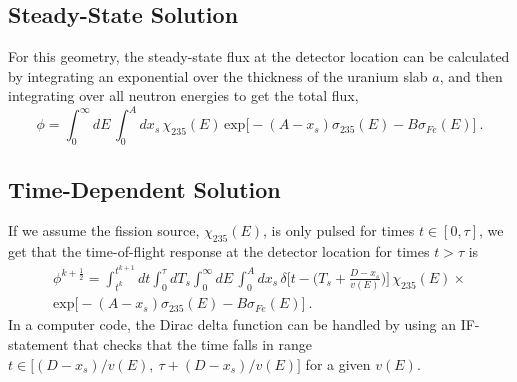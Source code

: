 \documentclass{article}
\begin{document}
\subsection{Steady-State Solution}
For this geometry, the steady-state flux at the detector location can be calculated by integrating an exponential over the thickness of the uranium slab $a$, and then integrating over all neutron energies to get the total flux,
\begin{equation}
\phi = \int_0^\infty dE \, \int_0^A dx_s \, \chi_{235}(E) \, \text{exp}\big[-(A - x_s) \sigma_{235}(E) - B \sigma_{Fe}(E)\big] \: .
\end{equation}

\subsection{Time-Dependent Solution}
If we assume the fission source, $\chi_{235}(E)$, is only pulsed for times $t \in [0, \tau]$, we get that the time-of-flight response at the detector location for times $t > \tau$ is 
\begin{multline}
\phi^{k+\frac{1}{2}} = \int_{t^{k}}^{t^{k+1}} dt \int_0^{\tau} dT_s \int_0^\infty dE \, \int_0^A dx_s \, \delta\Big[t - \Big(T_s + \frac{D-x_s}{v(E)}\Big)\Big] \, \chi_{235}(E) \times \\ \text{exp}\big[-(A - x_s) \sigma_{235}(E) -B \sigma_{Fe}(E)\big]  \: .
\end{multline}
In a computer code, the Dirac delta function can be handled by using an IF-statement that checks that the time falls in range $t \in \Big[(D-x_s)/v(E), \: \tau + (D-x_s)/v(E) \Big]$ for a given $v(E)$. 
\end{document}
